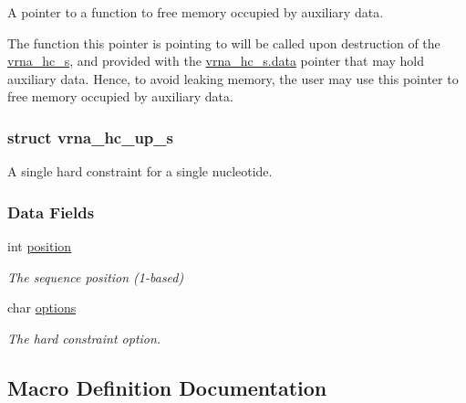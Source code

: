 A pointer to a function to free memory occupied by auxiliary data. 

The function this pointer is pointing to will be called upon destruction of the \hyperlink{group__hard__constraints_structvrna__hc__s}{vrna\+\_\+hc\+\_\+s}, and provided with the \hyperlink{group__hard__constraints_acef3d722142cb5f4a8e114e5fbce3b1a}{vrna\+\_\+hc\+\_\+s.\+data} pointer that may hold auxiliary data. Hence, to avoid leaking memory, the user may use this pointer to free memory occupied by auxiliary data. \label{structvrna__hc__up__s}
\hypertarget{group__hard__constraints_structvrna__hc__up__s}{}
\subsubsection{struct vrna\+\_\+hc\+\_\+up\+\_\+s}
A single hard constraint for a single nucleotide. \subsubsection*{Data Fields}
\begin{DoxyCompactItemize}
\item 
\hypertarget{group__hard__constraints_a67a98def263c534a8c57298098da16e8}{}int \hyperlink{group__hard__constraints_a67a98def263c534a8c57298098da16e8}{position}\label{group__hard__constraints_a67a98def263c534a8c57298098da16e8}

\begin{DoxyCompactList}\small\item\em The sequence position (1-\/based) \end{DoxyCompactList}\item 
\hypertarget{group__hard__constraints_a8bdeffbacefaa77d2d1c8ff0a7f52157}{}char \hyperlink{group__hard__constraints_a8bdeffbacefaa77d2d1c8ff0a7f52157}{options}\label{group__hard__constraints_a8bdeffbacefaa77d2d1c8ff0a7f52157}

\begin{DoxyCompactList}\small\item\em The hard constraint option. \end{DoxyCompactList}\end{DoxyCompactItemize}


\subsection{Macro Definition Documentation}
\hypertarget{group__hard__constraints_ga4bfc2f15c4f261c62a11af9d2aa80c90}{}
